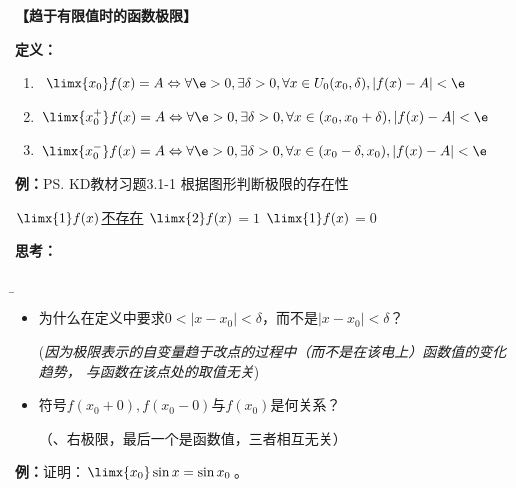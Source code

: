 {\bf 【趋于有限值时的函数极限】}

{\bf 定义：}
\begin{enumerate}[(1)]
  \setlength{\itemindent}{1cm}
  \item $\limx{x_0}f(x)=A\Leftrightarrow\forall \e>0,\exists\delta>0,\forall
  x\in U_0(x_0,\delta),|f(x)-A|<\e$
  \item $\limx{x_0^+}f(x)=A\Leftrightarrow\forall \e>0,\exists\delta>0,\forall
  x\in(x_0,x_0+\delta),|f(x)-A|<\e$
  \item $\limx{x_0^-}f(x)=A\Leftrightarrow\forall \e>0,\exists\delta>0,\forall
  x\in(x_0-\delta,x_0),|f(x)-A|<\e$
\end{enumerate}

{\bf 例：}\ps{KD教材习题3.1-1}
根据图形判断极限的存在性
\begin{center}
	
	$\limx{1}f(x)$\underline{不存在}
	\quad $\limx{2}f(x)$\underline{$=1$}
	\quad $\limx{1}f(x)$\underline{$=0$}
\end{center}

{\bf 思考：}{\b
	\begin{itemize}
	  \setlength{\itemindent}{1cm}
	  \item 为什么在定义中要求$0<|x-x_0|<\delta$，而不是$|x-x_0|<\delta$？
	  
	   \quad ({\it 因为极限表示的自变量趋于改点的过程中（而不是在该电上）函数值的变化趋势，
	   与函数在该点处的取值无关})
	  \item 符号$f(x_0+0),f(x_0-0)$与$f(x_0)$是何关系？
	  
	  \quad （{、右极限，最后一个是函数值，三者相互无关}）
	\end{itemize}
}

{\bf 例：}证明：$\limx{x_0}\sin x=\sin x_0$。

